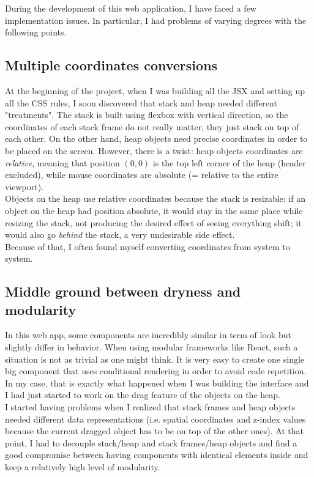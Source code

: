 \documentclass[]{usiinfbachelorproject}
\begin{document}

During the development of this web application, I have faced a few implementation issues. In particular, I had problems of varying degrees with the following points.

\subsection{Multiple coordinates conversions}

At the beginning of the project, when I was building all the JSX and setting up all the CSS rules, I soon discovered that stack and heap needed different "treatments". The stack is built using flexbox with vertical direction, so the coordinates of each stack frame do not really matter, they just stack on top of each other. On the other hand, heap objects need precise coordinates in order to be placed on the screen. However, there is a twist: heap objects coordinates are \emph{relative}, meaning that position ${(0,0)}$ is the top left corner of the heap (header excluded), while mouse coordinates are absolute (= relative to the entire viewport).\\
Objects on the heap use relative coordinates because the stack is resizable: if an object on the heap had position absolute, it would stay in the same place while resizing the stack, not producing the desired effect of seeing everything shift; it would also go \emph{behind} the stack, a very undesirable side effect.\\
Because of that, I often found myself converting coordinates from system to system.

\subsection{Middle ground between dryness and modularity}

In this web app, some components are incredibly similar in term of look but slightly differ in behavior. When using modular frameworks like React, such a situation is not as trivial as one might think. It is very easy to create one single big component that uses conditional rendering in order to avoid code repetition. In my case, that is exactly what happened when I was building the interface and I had just started to work on the drag feature of the objects on the heap.\\ I started having problems when I realized that stack frames and heap objects needed different data representations (i.e. spatial coordinates and z-index values because the current dragged object has to be on top of the other ones). At that point, I had to decouple stack/heap and stack frames/heap objects and find a good compromise between having components with identical elements inside and keep a relatively high level of modularity.
\end{document}
